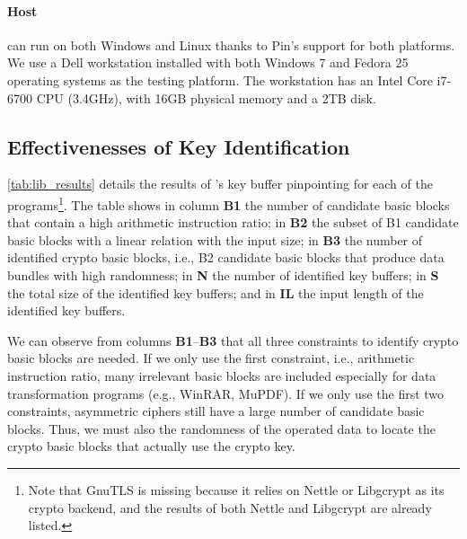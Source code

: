 \paragraph{Host} 
\sysname can run on both Windows and Linux thanks to Pin's support for both platforms. 
We use a Dell workstation installed with both Windows 7 and Fedora 25 operating systems as the testing platform. 
The workstation has an Intel Core i7-6700 CPU (3.4GHz), with 16GB physical memory and a 2TB disk. 


\subsection{Effectivenesses of Key Identification}\label{sec:eval:results}

\autoref{tab:lib_results} details the results of \sysname's key buffer pinpointing for each of the programs\footnote{Note that \textsf{\small GnuTLS} is missing because it relies on \textsf{\small Nettle} or \textsf{\small Libgcrypt} as its crypto backend, and the results of both \textsf{\small Nettle} and \textsf{\small Libgcrypt} are already listed.}. 
The table shows in column \textbf{B1} the number of candidate basic blocks that contain a high arithmetic instruction ratio; in \textbf{B2} the subset of B1 candidate basic blocks with a linear relation with the input size; in \textbf{B3} the number of identified crypto basic blocks, i.e., B2 candidate basic blocks that produce data bundles with high randomness; in \textbf{N} the number of identified key buffers; in \textbf{S} the total size of the identified key buffers; and in \textbf{IL} the input length of the identified key buffers.

We can observe from columns \textbf{B1}--\textbf{B3} that all three constraints to identify crypto basic blocks are needed.
If we only use the first constraint, i.e., arithmetic instruction ratio, many irrelevant basic blocks are included especially for data transformation programs (e.g., \textsf{\small WinRAR, MuPDF}). 
If we only use the first two constraints, asymmetric ciphers still have a large number of candidate basic blocks. 
Thus, we must also the randomness of the operated data to locate the crypto basic blocks that actually use the crypto key. 

